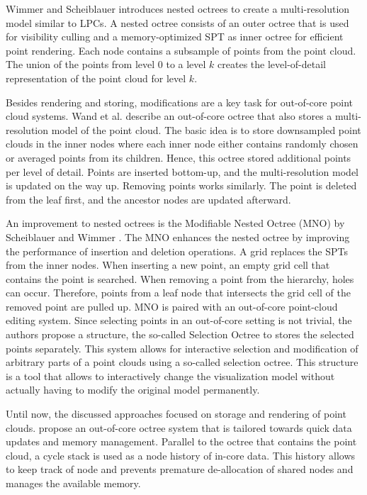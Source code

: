 \par

Wimmer and Scheiblauer \cite{wimmer2006instant} introduces nested octrees to create a multi-resolution model similar to LPCs. A nested octree consists of an outer octree that is used for visibility culling and a memory-optimized SPT as inner octree for efficient point rendering. Each node contains a subsample of points from the point cloud. The union of the points from level 0 to a level $k$ creates the level-of-detail representation of the point cloud for level $k$. 

\par

Besides rendering and storing, modifications are a key task for out-of-core point cloud systems. Wand et al. \cite{wand2007interactive} describe an out-of-core octree that also stores a multi-resolution model of the point cloud. The basic idea is to store downsampled point clouds in the inner nodes where each inner node either contains randomly chosen or averaged points from its children. Hence, this octree stored additional points per level of detail. Points are inserted bottom-up, and the multi-resolution model is updated on the way up. Removing points works similarly. The point is deleted from the leaf first, and the ancestor nodes are updated afterward. 

\par

An improvement to nested octrees is the Modifiable Nested Octree (MNO) by Scheiblauer and Wimmer \cite{scheiblauer2011out}. The MNO enhances the nested octree by improving the performance of insertion and deletion operations. A grid replaces the SPTs from the inner nodes. When inserting a new point, an empty grid cell that contains the point is searched. When removing a point from the hierarchy, holes can occur. Therefore, points from a leaf node that intersects the grid cell of the removed point are pulled up. MNO is paired with an out-of-core point-cloud editing system. Since selecting points in an out-of-core setting is not trivial, the authors propose a structure, the so-called Selection Octree to stores the selected points separately. This system allows for interactive selection and modification of arbitrary parts of a point clouds using a so-called selection octree. This structure is a tool that allows to interactively change the visualization model without actually having to modify the original model permanently. 

\par

Until now, the discussed approaches focused on storage and rendering of point clouds. \cite{wenzel2014out} propose an out-of-core octree system that is tailored towards quick data updates and memory management. Parallel to the octree that contains the point cloud, a cycle stack is used as a node history of in-core data. This history allows to keep track of node and prevents premature de-allocation of shared nodes and manages the available memory. 

